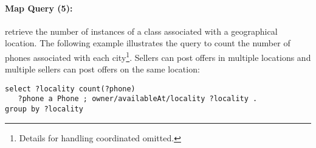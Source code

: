 \paragraph{Map Query (5):} retrieve the number of instances of a class associated with a geographical location.
The following example illustrates the query to count the number of phones associated with each city\footnote{Details for handling coordinated omitted.}. 
Sellers can post offers in multiple locations and multiple sellers can post offers on the same location:
{\footnotesize
\begin{center}
\begin{verbatim}
select ?locality count(?phone)
   ?phone a Phone ; owner/availableAt/locality ?locality .
group by ?locality
\end{verbatim}
\end{center}}